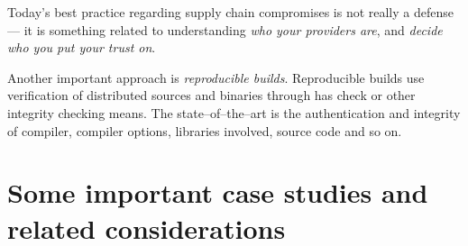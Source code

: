 \documentclass[10pt]{\classname}
\begin{document}
Today's best practice regarding supply chain compromises is not really a
defense --- it is something related to understanding \emph{who your providers
are}, and \emph{decide who you put your trust on}.

Another important approach is \emph{reproducible builds}. Reproducible builds
use verification of distributed sources and binaries through has check or other
integrity checking means. The state--of--the--art is the authentication and
integrity of compiler, compiler options, libraries involved, source code and so
on.

\chapter{Some important case studies and related considerations}
\end{document}
